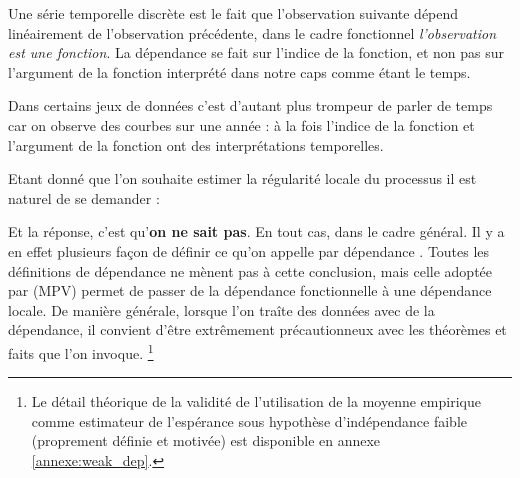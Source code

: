 
Une série temporelle discrète est le fait que l'observation suivante dépend linéairement de l'observation précédente, dans le cadre fonctionnel \emph{l'observation est une fonction}. La dépendance se fait sur l'indice de la fonction, et non pas sur l'argument de la fonction interprété dans notre caps comme étant le temps.

\bigskip

Dans certains jeux de données c'est d'autant plus trompeur de parler de temps car on observe des courbes sur une année : à la fois l'indice de la fonction et l'argument de la fonction ont des interprétations temporelles.

\smallskip

\noindent{}

\bigskip

\noindent Etant donné que l'on souhaite estimer la régularité locale du processus il est naturel de se demander :

\noindent Et la réponse, c'est qu'\textbf{on ne sait pas}. En tout cas, dans le cadre général. Il y a en effet plusieurs façon de définir ce qu'on appelle par \og dépendance \fg. Toutes les définitions de dépendance ne mènent pas à cette conclusion, mais celle adoptée par (MPV) permet de passer de la dépendance fonctionnelle à une dépendance locale. De manière générale, lorsque l'on traîte des données avec de la dépendance, il convient d'être extrêmement précautionneux avec les théorèmes et \og faits \fg que l'on invoque. \footnote{Le détail théorique de la validité de l'utilisation de la moyenne empirique comme estimateur de l'espérance sous hypothèse d'indépendance faible (proprement définie et motivée) est disponible en annexe \ref{annexe:weak_dep}.}